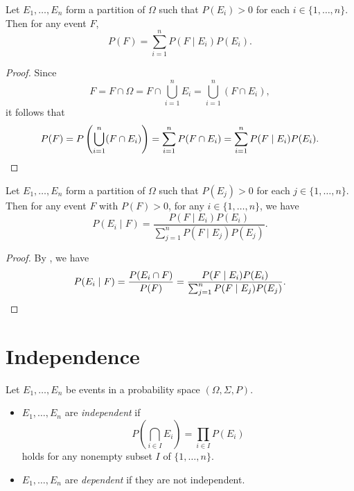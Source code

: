\begin{theorem}\label{thm:total-probability}
  Let $E_1, \dots, E_n$ form a partition of $\Omega$ such that $P(E_i) > 0$
  for each $i \in \{1, \dots, n\}$.
  Then for any event $F$,
  \begin{equation*}
    P(F) = \sum_{i=1}^n P(F \mid E_i)P(E_i).
  \end{equation*}
\end{theorem}
\begin{proof}
  Since
  \begin{equation*}
    F = F \cap \Omega
      = F \cap \bigcup_{i=1}^n E_i
      = \bigcup_{i=1}^n (F \cap E_i),
  \end{equation*}
  it follows that
  \begin{equation*}
    P(F)
    = P\left(\bigcup_{i=1}^n (F \cap E_i)\right)
    = \sum_{i=1}^n P(F \cap E_i)
    = \sum_{i=1}^n P(F \mid E_i)P(E_i). \qedhere
  \end{equation*}
\end{proof}

\begin{theorem}\label{thm:bayes}
  Let $E_1, \dots, E_n$ form a partition of $\Omega$ such that $P(E_j) > 0$
  for each $j \in \{1, \dots, n\}$.
  Then for any event $F$ with $P(F) > 0$, for any $i \in \{1, \dots, n\}$,
  we have
  \begin{equation*}
    P(E_i \mid F) = \frac{P(F \mid E_i)P(E_i)}
                         {\sum_{j=1}^n P(F \mid E_j)P(E_j)}.
  \end{equation*}
\end{theorem}
\begin{proof}
  By , we have
  \begin{equation*}
    P(E_i \mid F)
    = \frac{P(E_i \cap F)}{P(F)}
    = \frac{P(F \mid E_i)P(E_i)}
           {\sum_{j=1}^n P(F \mid E_j)P(E_j)}. \qedhere
  \end{equation*}
\end{proof}

\section{Independence}
\begin{definition}
  Let $E_1, \dots, E_n$ be events in a probability space
  $(\Omega, \Sigma, P)$.
  \begin{itemize}
    \item $E_1, \dots, E_n$ are \emph{independent} if
      \begin{equation*}
        P\left(\bigcap_{i \in I} E_i\right)
        = \prod_{i \in I} P(E_i)
      \end{equation*}
      holds for any nonempty subset $I$ of $\{1, \dots, n\}$.
    \item $E_1, \dots, E_n$ are \emph{dependent} if they are not independent.
  \end{itemize}
\end{definition}

